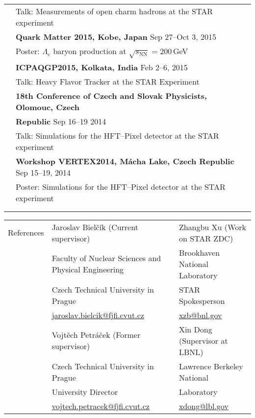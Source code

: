\documentclass[a4paper,11pt,oneside]{article}
\begin{document}
\begin{tabular}{@{} l l}
     & Talk: Measurements of open charm hadrons at the STAR experiment \\[.2cm]
     & \textbf{Quark Matter 2015, Kobe, Japan} Sep 27--Oct 3, 2015\\
     & Poster: $\Lambda_\mathrm{c}$ baryon production at $\sqrt{s_\mathrm{NN}} = 200\,$GeV \\[.2cm]
     & \textbf{ICPAQGP2015, Kolkata, India} Feb 2--6, 2015\\
     & Talk: Heavy Flavor Tracker at the STAR Experiment \\[.2cm]
     & \textbf{18th Conference of Czech and Slovak Physicists, Olomouc, Czech} \\
     & \textbf{Republic} Sep 16--19 2014 \\
     & Talk: Simulations for the HFT--Pixel detector at the STAR experiment\\[.2cm]
     & \textbf{Workshop VERTEX2014, Mácha Lake, Czech Republic} Sep 15--19, 2014\\
     & Poster: Simulations for the HFT--Pixel detector at the STAR experiment \\
     & \\
     \\
\end{tabular}

\noindent \begin{tabular}{@{} l l l}
 \Large{References} & Jaroslav Bielčík (Current supervisor)& Zhangbu Xu (Work on STAR ZDC) \\
 & Faculty of Nuclear Sciences and Physical Engineering &  Brookhaven National Laboratory  \\
 & Czech Technical University in Prague &  STAR Spokesperson \\
 & \small{\href{mailto:jaroslav.bielcik@fjfi.cvut.cz}{jaroslav.bielcik@fjfi.cvut.cz}} & \small{\href{mailto:xzb@bnl.gov}{xzb@bnl.gov}} \\[.2cm]
 & Vojtěch Petráček (Former supervisor)  &  Xin Dong (Supervisor at LBNL) \\
 & Czech Technical University in Prague  &  Lawrence Berkeley National \\
 & University Director &  Laboratory \\
 & \small{\href{mailto:vojtech.petracek@fjfi.cvut.cz}{vojtech.petracek@fjfi.cvut.cz}} & \small{\href{mailto:xdong@lbl.gov}{xdong@lbl.gov}} \\
\end{tabular}
\end{document}
